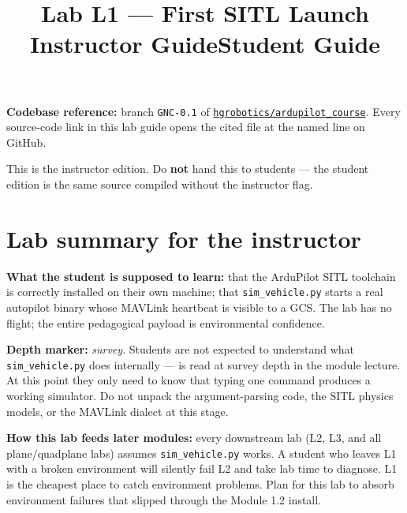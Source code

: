 \documentclass[a4paper,11pt,twoside]{article}
\title{Lab L1 --- First SITL Launch\\
  \large \ifinstructor Instructor Guide\else Student Guide\fi}
\author{\copyrightline}
\date{}
\begin{document}
\maketitle

\noindent\textbf{Codebase reference:} branch \texttt{GNC-0.1} of \href{\repourl}{\nolinkurl{hgrobotics/ardupilot_course}}. Every source-code link in this lab guide opens the cited file at the named line on GitHub.

\bigskip

\ifinstructor

\begin{tcolorbox}[colback=red!5!white,colframe=red!40!black,title=Instructor edition]
This is the instructor edition. Do \textbf{not} hand this to students --- the student edition is the same source compiled without the instructor flag.
\end{tcolorbox}

\section*{Lab summary for the instructor}

\textbf{What the student is supposed to learn:} that the ArduPilot SITL toolchain is correctly installed on their own machine; that \texttt{sim\_vehicle.py} starts a real autopilot binary whose MAVLink heartbeat is visible to a GCS. The lab has no flight; the entire pedagogical payload is environmental confidence.

\textbf{Depth marker:} \emph{survey}. Students are not expected to understand what \texttt{sim\_vehicle.py} does internally ---  is read at survey depth in the module lecture. At this point they only need to know that typing one command produces a working simulator. Do not unpack the argument-parsing code, the SITL physics models, or the MAVLink dialect at this stage.

\textbf{How this lab feeds later modules:} every downstream lab (L2, L3, and all plane/quadplane labs) assumes \texttt{sim\_vehicle.py} works. A student who leaves L1 with a broken environment will silently fail L2 and take lab time to diagnose. L1 is the cheapest place to catch environment problems. Plan for this lab to absorb environment failures that slipped through the Module 1.2 install.
\end{document}
